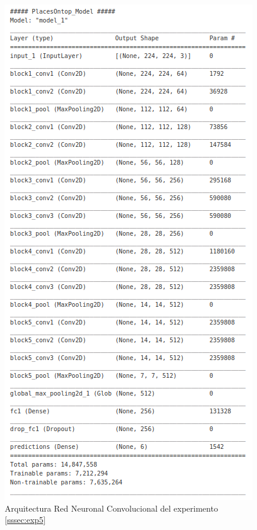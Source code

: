 \begin{figure}[h!]
	\centering
	\includegraphics[width=0.7\linewidth]{images/architecture_exp4_6_cnn}
	\caption{Arquitectura Red Neuronal Convolucional del  experimento \ref{sssec:exp5}}
	\label{fig:architectureexp5}
\end{figure}